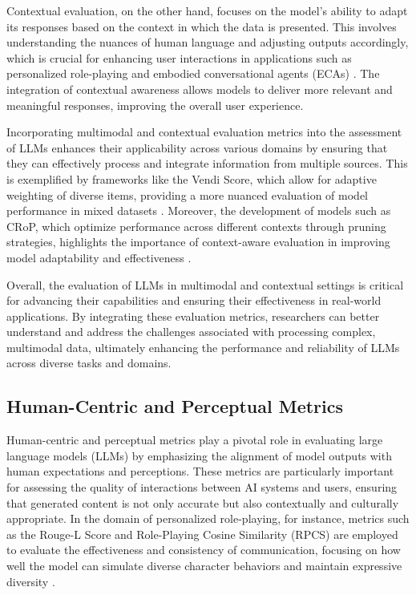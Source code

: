 Contextual evaluation, on the other hand, focuses on the model's ability to adapt its responses based on the context in which the data is presented. This involves understanding the nuances of human language and adjusting outputs accordingly, which is crucial for enhancing user interactions in applications such as personalized role-playing and embodied conversational agents (ECAs) . The integration of contextual awareness allows models to deliver more relevant and meaningful responses, improving the overall user experience.



Incorporating multimodal and contextual evaluation metrics into the assessment of LLMs enhances their applicability across various domains by ensuring that they can effectively process and integrate information from multiple sources. This is exemplified by frameworks like the Vendi Score, which allow for adaptive weighting of diverse items, providing a more nuanced evaluation of model performance in mixed datasets \cite{pasarkar2024cousinsvendiscorefamily}. Moreover, the development of models such as CRoP, which optimize performance across different contexts through pruning strategies, highlights the importance of context-aware evaluation in improving model adaptability and effectiveness \cite{kaur2024cropcontextwiserobuststatic}.



Overall, the evaluation of LLMs in multimodal and contextual settings is critical for advancing their capabilities and ensuring their effectiveness in real-world applications. By integrating these evaluation metrics, researchers can better understand and address the challenges associated with processing complex, multimodal data, ultimately enhancing the performance and reliability of LLMs across diverse tasks and domains.



\subsection{Human-Centric and Perceptual Metrics} \label{subsec:Human-Centric and Perceptual Metrics}



Human-centric and perceptual metrics play a pivotal role in evaluating large language models (LLMs) by emphasizing the alignment of model outputs with human expectations and perceptions. These metrics are particularly important for assessing the quality of interactions between AI systems and users, ensuring that generated content is not only accurate but also contextually and culturally appropriate. In the domain of personalized role-playing, for instance, metrics such as the Rouge-L Score and Role-Playing Cosine Similarity (RPCS) are employed to evaluate the effectiveness and consistency of communication, focusing on how well the model can simulate diverse character behaviors and maintain expressive diversity \cite{tao2024rolecraftglmadvancingpersonalizedroleplaying}.



